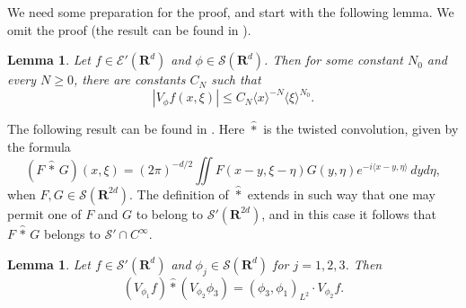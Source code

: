 \documentclass[12pt,a4paper,reqno]{amsart}
\numberwithin{equation}{section}
\numberwithin{thm}{section}
\newtheorem{lemma}[thm]{Lemma}
\theoremstyle{definition}
\theoremstyle{remark}
\begin{document}
\par

We need some preparation for the proof, and start with the following
lemma. We omit the proof (the result can be found in \cite{CG1}).

\par

\begin{lemma}\label{STFTdecay}
Let $f\in \mathscr E'({\mathbf R^{d}})$ and $\phi \in \mathscr S ({\mathbf R^{d}})$. Then
for some constant $N_0$ and every $N\geq 0$, there are constants $C_N$
such that
$$
|V_{\phi} f(x,\xi)| \leq C_N {\langle x\rangle} ^{-N}{\langle \xi\rangle}^{N_0}.
$$
\end{lemma} 

\par

The following result can be found in \cite{Gro-book}. Here $\widehat
*$ is the twisted convolution, given by the formula
$$
(F\, \widehat *\, G)(x,\xi )=(2\pi )^{-d/2}\iint F(x-y,\xi -\eta
)G(y,\eta )e^{-i{\langle {x-y},\eta\rangle}}\, dyd\eta ,
$$
when $F,G\in \mathscr S({\mathbf R^{{2d}}})$. The definition of $\widehat *$
extends in such way that one may permit one  of $F$ and $G$ to belong
to $\mathscr S'({\mathbf R^{{2d}}})$, and in this case it follows that $F \,
\widehat * \, G$ belongs to $\mathscr S'\cap C^\infty$.

\par

\begin{lemma}\label{stftproperties}
Let $f\in \mathscr S'({\mathbf R^{d}})$ and $\phi _j\in
\mathscr S({\mathbf R^{d}})$ for $j=1,2,3$. Then
$$
(V_{\phi _1}f)\widehat*(V_{\phi _2}\phi _3) = (\phi
_3,\phi _1)_{L^2}\cdot V_{\phi _2}f.
$$
\end{lemma}

\par
\end{document}
